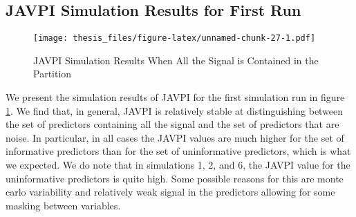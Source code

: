 \documentclass[12pt,twoside]{reedthesis}
\theoremstyle{definition}
\theoremstyle{definition}
\theoremstyle{definition}
\theoremstyle{remark}
\begin{document}
\subsection{JAVPI Simulation Results for First
Run}\label{javpi-simulation-results-for-first-run}
\begin{figure}
\centering
\texttt{[image: thesis\_files/figure-latex/unnamed-chunk-27-1.pdf]}
\caption{\label{fig:unnamed-chunk-27}\label{JAVPIonesig}JAVPI Simulation
Results When All the Signal is Contained in the Partition}
\end{figure}
We present the simulation results of JAVPI for the first simulation run
in figure \ref{JAVPIonesig}. We find that, in general, JAVPI is
relatively stable at distinguishing between the set of predictors
containing all the signal and the set of predictors that are noise. In
particular, in all cases the JAVPI values are much higher for the set of
informative predictors than for the set of uninformative predictors,
which is what we expected. We do note that in simulations 1, 2, and 6,
the JAVPI value for the uninformative predictors is quite high. Some
possible reasons for this are monte carlo variability and relatively
weak signal in the predictors allowing for some masking between
variables. \par 
\end{document}
